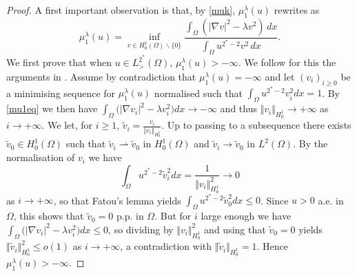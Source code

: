 \documentclass[10pt]{amsart}
\numberwithin{equation}{section}
\newcommand{\Om}{\Omega}
\newcommand{\ben}{\begin{equation}}
\newcommand{\een}{\end{equation}}
\theoremstyle{plain}
\theoremstyle{remark}
\begin{document}
\begin{proof}
A first important observation is that, by \eqref{muk}, $\mu_1^{\lambda}(u)$ rewrites as 
\ben \label{mu1eq}
 \mu_{1}^{\lambda}(u) = \inf_{v \in H^1_0(\Om)  \backslash \{0\}} \frac{\int_{\Om}\left(  |\nabla v|^2 - \lambda v^2 \right) \, dx}{\int_{\Om} u^{2^*-2} v^2 \, dx}. 
 \een
We first prove that when $u \in L^{2^*}_>(\Om)$, $\mu_1^{\lambda}(u) > - \infty$. We follow for this the arguments in \cite[Proposition 2.2]{ElSayed}. Assume by contradiction that $\mu_1^{\lambda}(u) = - \infty$ and let $(v_i)_{i \ge0}$ be a minimising sequence for $\mu_1^{\lambda}(u)$ normalised such that $\int_\Om u^{2^*-2} v_i^2 dx = 1$. By \eqref{mu1eq} we then have $\int_{\Om}\big( |\nabla v_i|^2 - \lambda v_i^2 \big) dx \to - \infty$ and thus $\Vert v_i \Vert_{H^1_0} \to + \infty$ as $i \to + \infty$. We let, for $i \ge 1$, $\tilde{v}_i = \frac{v_i}{\Vert v_i\Vert_{H^1_0}}$. Up to passing to a subsequence there exists $\tilde{v}_0 \in H^1_0(\Om)$ such that $\tilde{v}_i \rightharpoonup \tilde{v}_0$ in $H^1_0(\Om)$ and $\tilde{v}_i \to \tilde{v}_0$ in $L^2(\Om)$. By the normalisation of $v_i$ we have
$$ \int_{\Om} u^{2^*-2} \tilde{v}_i^2dx = \frac{1}{\Vert v_i \Vert_{H^1_0}^2} \to 0 $$
as $ i \to + \infty$, so that Fatou's lemma yields $\int_\Om u^{2^*-2} \tilde{v}_0^2dx \le 0$. Since $u>0$ a.e. in $\Omega$, this shows that $\tilde{v}_0 = 0$ p.p. in $\Om$. But for $i$ large enough we have $\int_{\Om}\big( |\nabla v_i|^2 - \lambda v_i^2 \big)dx  \le 0$, so dividing by $\Vert v_i \Vert_{H^1_0}^2$ and using that $\tilde{v}_0 = 0$ yields $\Vert \tilde{v}_i \Vert_{H^1_0}^2 \le o(1)$ as $i \to + \infty$, a contradiction with $\Vert \tilde{v}_i \Vert_{H^1_0} = 1$. Hence $\mu_1^{\lambda}(u) > - \infty$.


\end{proof}
\end{document}
